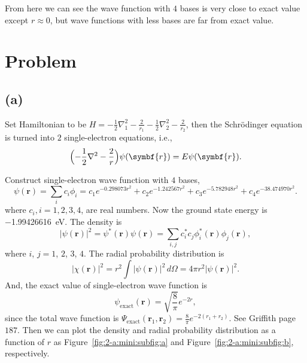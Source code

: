 From here we can see the wave function with $4$ bases is very close to exact value except $r \approx 0$, but
wave functions with less bases are far from exact value.


\section{Problem }

\subsection*{(a)}

Set Hamiltonian to be $H = -\frac{1}{2}\nabla_1^2 - \frac{2}{r_1} - \frac{1}{2}\nabla_2^2 - \frac{2}{r_2}$, then
the Schrödinger equation is turned into $2$ single-electron equations, i.e.,
%
\begin{equation}
    \Bigl(-\frac{1}{2}\nabla^2 - \frac{2}{r}\Bigr) \psi(\symbf{r}) = E \psi(\symbf{r}).
\end{equation}

Construct single-electron wave function with $4$ bases,
%
\begin{equation}
    \psi(\symbf{r}) = \sum_{i} c_i \phi_i = c_1 e^{- 0.298073 r^2} +
    c_2 e^{- 1.242567 r^2} + c_3 e^{- 5.782948 r^2} + c_4 e^{-38.474970 r^2}.
\end{equation}
%
where $c_i, i=1,2,3,4$, are real numbers.
Now the ground state energy is \SI{-1.99426616}{\electronvolt}. The density is
%
\begin{equation}\label{eq:density}
    \lvert \psi(\symbf{r}) \rvert^2 = \psi^\ast(\symbf{r}) \psi(\symbf{r}) =
    \sum_{i, j} c_i^\ast c_j \phi_i^\ast(\symbf{r}) \phi_j(\symbf{r}),
\end{equation}
%
where $i$, $j = 1$, $2$, $3$, $4$. The radial probability distribution is
%
\begin{equation}
    \lvert \chi(\symbf{r}) \rvert^2 = r^2\int \lvert \psi(\symbf{r}) \rvert^2
    \, d\Omega = 4\pi r^2 \lvert \psi(\symbf{r}) \rvert^2.
\end{equation}
%
And, the exact value of single-electron wave function is
%
\begin{equation}
    \psi_{\text{exact}}(\symbf{r}) = \sqrt{\frac{8}{\pi}} e^{-2 r}, %
\end{equation}
%
since the total wave function is $\Psi_{\text{exact}}(\symbf{r}_1, \symbf{r}_2) = \frac{8}{\pi} e^{-2(r_1 + r_2)}$.
See Griffith page $187$\footnotemark.
Then we can plot the density and radial probability distribution as a function of $r$
as Figure~\ref{fig:2-a:mini:subfig:a} and Figure~\ref{fig:2-a:mini:subfig:b}, respectively.

